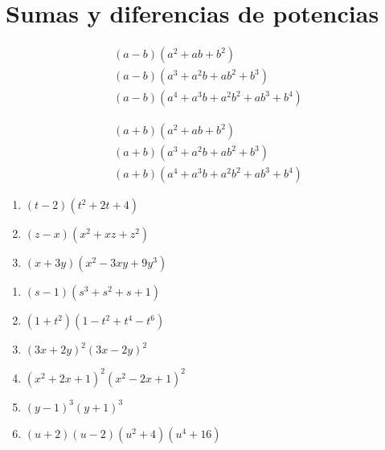 
\section{Sumas y diferencias de potencias}


	\begin{problema}
		\begin{align*}
			\left( a-b \right)\left( a^{2}+ab+b^{2} \right)\\
			\left( a-b \right)\left( a^{3}+a^{2}b+ab^{2}+b^{3} \right)\\
			\left( a-b \right)\left( a^{4}+a^{3}b+a^{2}b^{2}+ab^{3}+b^{4} \right)
		\end{align*}
		
	\end{problema}
	



	\begin{problema}
		\begin{align*}
			\left( a+b \right)\left( a^{2}+ab+b^{2} \right)\\
			\left( a+b \right)\left( a^{3}+a^{2}b+ab^{2}+b^{3} \right)\\
			\left( a+b \right)\left( a^{4}+a^{3}b+a^{2}b^{2}+ab^{3}+b^{4} \right)
		\end{align*}
		
	\end{problema}
	



	\begin{problema}
		\begin{enumerate}
			\item $\left( t-2 \right)\left( t^{2}+2t+4 \right)$ 
			\item $\left( z-x \right)\left( x^{2}+xz+z^{2} \right)$ 
			\item $\left( x+3y \right)\left( x^{2}-3xy+9y^{3} \right)$
		\end{enumerate}
		
	\end{problema}
	



	\begin{problema}
		\begin{enumerate}
			\item $\left( s-1 \right)\left( s^{3}+s^{2}+s +1\right)$ 
			\item $\left( 1+t^{2} \right)\left( 1-t^{2}+t^{4}-t^{6} \right)$ 
			\item $\left( 3x+2y \right)^{2}\left( 3x-2y \right)^{2}$ 
			\item $\left( x^{2}+2x+1 \right)^{2}\left( x^{2}-2x+1 \right)^{2}$ 
			\item $\left( y-1 \right)^{3}\left( y+1 \right)^{3}$
			\item $(u+2)(u-2)(u^{2}+4)(u^{4}+16)$
		\end{enumerate}
		
	\end{problema}
	

